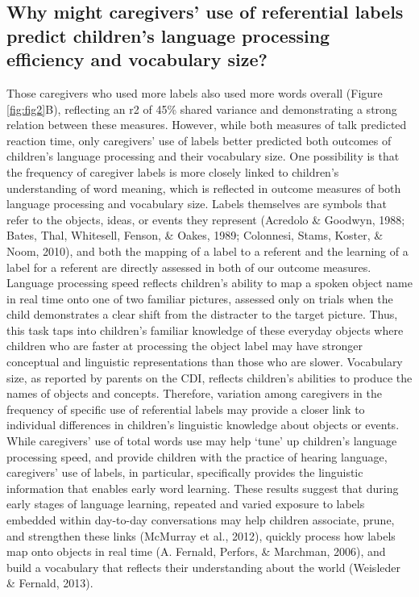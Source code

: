 \documentclass[
  man,floatsintext]{apa6}
\begin{document}
\hypertarget{why-might-caregivers-use-of-referential-labels-predict-childrens-language-processing-efficiency-and-vocabulary-size}{%
\subsection{Why might caregivers' use of referential labels predict children's language processing efficiency and vocabulary size?}\label{why-might-caregivers-use-of-referential-labels-predict-childrens-language-processing-efficiency-and-vocabulary-size}}

Those caregivers who used more labels also used more words overall (Figure \ref{fig:fig2}B), reflecting an r2 of 45\% shared variance and demonstrating a strong relation between these measures. However, while both measures of talk predicted reaction time, only caregivers' use of labels better predicted both outcomes of children's language processing and their vocabulary size. One possibility is that the frequency of caregiver labels is more closely linked to children's understanding of word meaning, which is reflected in outcome measures of both language processing and vocabulary size. Labels themselves are symbols that refer to the objects, ideas, or events they represent (Acredolo \& Goodwyn, 1988; Bates, Thal, Whitesell, Fenson, \& Oakes, 1989; Colonnesi, Stams, Koster, \& Noom, 2010), and both the mapping of a label to a referent and the learning of a label for a referent are directly assessed in both of our outcome measures. Language processing speed reflects children's ability to map a spoken object name in real time onto one of two familiar pictures, assessed only on trials when the child demonstrates a clear shift from the distracter to the target picture. Thus, this task taps into children's familiar knowledge of these everyday objects where children who are faster at processing the object label may have stronger conceptual and linguistic representations than those who are slower. Vocabulary size, as reported by parents on the CDI, reflects children's abilities to produce the names of objects and concepts. Therefore, variation among caregivers in the frequency of specific use of referential labels may provide a closer link to individual differences in children's linguistic knowledge about objects or events. While caregivers' use of total words use may help `tune' up children's language processing speed, and provide children with the practice of hearing language, caregivers' use of labels, in particular, specifically provides the linguistic information that enables early word learning. These results suggest that during early stages of language learning, repeated and varied exposure to labels embedded within day-to-day conversations may help children associate, prune, and strengthen these links (McMurray et al., 2012), quickly process how labels map onto objects in real time (A. Fernald, Perfors, \& Marchman, 2006), and build a vocabulary that reflects their understanding about the world (Weisleder \& Fernald, 2013).
\end{document}
